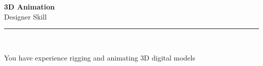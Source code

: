 \documentclass[11pt,a4paper]{memoir}
\begin{document}
    \begin{Spacing}{0.75}%
        \noindent
        \Large
        \textbf{3D Animation}\\[3pt]
        \scriptsize\color{gray}Designer Skill\\ 
        \rule{\textwidth}{.3mm}\\
        
        \vspace{3mm}
        \noindent
        \begin{minipage}[t]{53mm}
            \begin{flushleft}
            {
                \normalsize
                \begin{Spacing}{1}%
                \color{black}\textrm{You have experience rigging and animating 3D digital models}\\
                \end{Spacing}
            }
            \end{flushleft}
        \end{minipage}

        \vspace{5mm}
        \noindent
        \begin{minipage}[t]{53mm}
            \begin{flushleft}
            {
                \normalsize
                \begin{Spacing}{1}%
                \color{gray}\textit{}\\
                \end{Spacing}
            }
            \end{flushleft}
        \end{minipage}
    \end{Spacing}
    \clearpage
\end{document}
